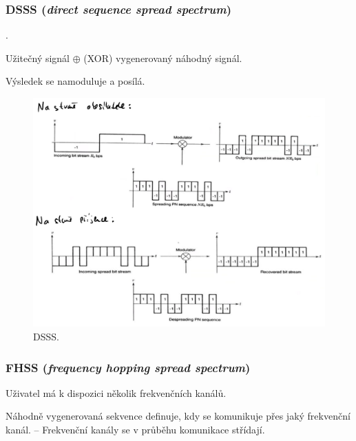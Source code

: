 \subsubsection{DSSS (\textit{direct sequence spread spectrum})}

\begin{compactitem}
    \item {}.
    \item Užitečný signál $\oplus$ (XOR) vygenerovaný náhodný signál.
    \item Výsledek se namoduluje a posílá.
\end{compactitem}

\begin{figure}[H]
    \centering
    \includegraphics[width=1\linewidth]{dsss.pdf}
    \caption{DSSS.}
\end{figure}

\subsubsection{FHSS (\textit{frequency hopping spread spectrum})}

\begin{compactitem}
    \item Uživatel má k dispozici několik frekvenčních kanálů.
    \item Náhodně vygenerovaná sekvence definuje, kdy se komunikuje přes jaký frekvenční kanál. -- Frekvenční kanály se v průběhu komunikace střídají.
\end{compactitem}

